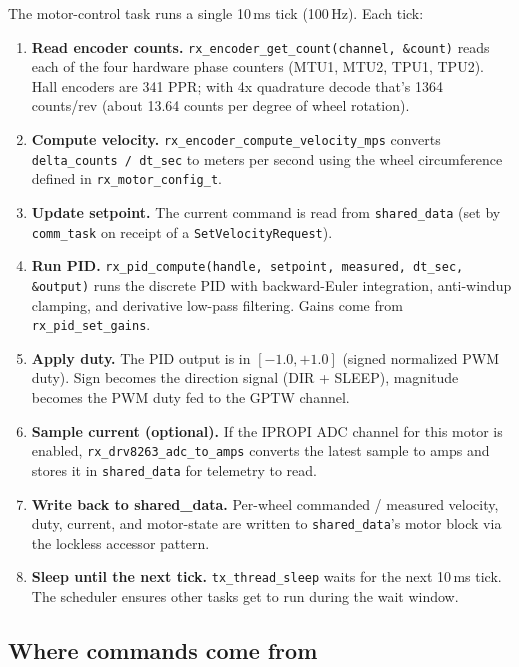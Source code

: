 The motor-control task runs a single 10\,ms tick (100\,Hz). Each tick:

\begin{enumerate}
  \item \textbf{Read encoder counts.}
        \texttt{rx\_encoder\_get\_count(channel, \&count)} reads each
        of the four hardware phase counters (MTU1, MTU2, TPU1, TPU2).
        Hall encoders are 341 PPR; with 4x quadrature decode that's
        1364 counts/rev (about 13.64 counts per degree of wheel
        rotation).
  \item \textbf{Compute velocity.}
        \texttt{rx\_encoder\_compute\_velocity\_mps} converts
        \texttt{delta\_counts / dt\_sec} to meters per second using
        the wheel circumference defined in \texttt{rx\_motor\_config\_t}.
  \item \textbf{Update setpoint.} The current command is read from
        \texttt{shared\_data} (set by \texttt{comm\_task} on receipt
        of a \texttt{SetVelocityRequest}).
  \item \textbf{Run PID.} \texttt{rx\_pid\_compute(handle, setpoint,
        measured, dt\_sec, \&output)} runs the discrete PID with
        backward-Euler integration, anti-windup clamping, and
        derivative low-pass filtering. Gains come from
        \texttt{rx\_pid\_set\_gains}.
  \item \textbf{Apply duty.} The PID output is in $[-1.0, +1.0]$
        (signed normalized PWM duty). Sign becomes the direction
        signal (DIR + SLEEP), magnitude becomes the PWM duty fed to
        the GPTW channel.
  \item \textbf{Sample current (optional).} If the IPROPI ADC channel
        for this motor is enabled, \texttt{rx\_drv8263\_adc\_to\_amps}
        converts the latest sample to amps and stores it in
        \texttt{shared\_data} for telemetry to read.
  \item \textbf{Write back to shared\_data.} Per-wheel commanded /
        measured velocity, duty, current, and motor-state are written
        to \texttt{shared\_data}'s motor block via the lockless
        accessor pattern.
  \item \textbf{Sleep until the next tick.} \texttt{tx\_thread\_sleep}
        waits for the next 10\,ms tick. The scheduler ensures other
        tasks get to run during the wait window.
\end{enumerate}

\subsection{Where commands come from}

